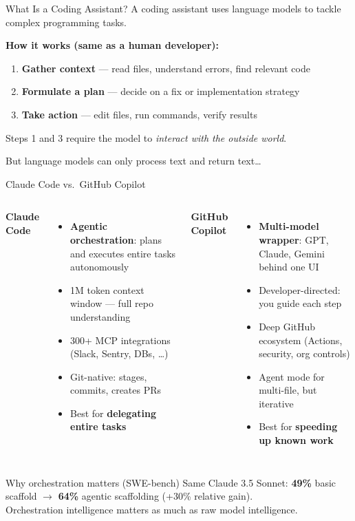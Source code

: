 \documentclass[aspectratio=169]{beamer}
\begin{document}
\begin{frame}{What Is a Coding Assistant?}
A coding assistant uses language models to tackle complex programming tasks.

\bigskip
\textbf{How it works (same as a human developer):}
\begin{enumerate}
  \item \textbf{\color{popblue}Gather context} --- read files, understand errors, find relevant code
  \item \textbf{\color{paramgreen}Formulate a plan} --- decide on a fix or implementation strategy
  \item \textbf{\color{orange1}Take action} --- edit files, run commands, verify results
\end{enumerate}

\bigskip
Steps 1 and 3 require the model to \emph{interact with the outside world}.

But language models can only process text and return text\ldots
\end{frame}

\begin{frame}{Claude Code vs.\ GitHub Copilot}
\begin{columns}[T]
\textbf{\color{popblue}Claude Code}
\begin{itemize}
  \item \textbf{Agentic orchestration}: plans and executes entire tasks autonomously
  \item 1M token context window --- full repo understanding
  \item 300+ MCP integrations (Slack, Sentry, DBs, \ldots)
  \item Git-native: stages, commits, creates PRs
  \item Best for \textbf{delegating entire tasks}
\end{itemize}

\textbf{\color{sampred}GitHub Copilot}
\begin{itemize}
  \item \textbf{Multi-model wrapper}: GPT, Claude, Gemini behind one UI
  \item Developer-directed: you guide each step
  \item Deep GitHub ecosystem (Actions, security, org controls)
  \item Agent mode for multi-file, but iterative
  \item Best for \textbf{speeding up known work}
\end{itemize}
\end{columns}

\smallskip
\begin{block}{Why orchestration matters (SWE-bench)}
Same Claude 3.5 Sonnet: \textbf{49\%} basic scaffold $\to$ \textbf{64\%} agentic scaffolding (+30\% relative gain). \\
{\small Orchestration intelligence matters as much as raw model intelligence.}
\end{block}
\end{frame}
\end{document}
